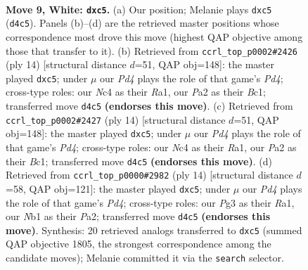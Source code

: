 \documentclass[11pt]{article}
\begin{document}
\clearpage

\begin{figure}[p]\centering
\begin{subfigure}{0.46\textwidth}\centering
\resizebox{\linewidth}{!}{%
\newchessgame
\chessboard[
  setfen={rnbq1rk1/pp2bpp1/4pn2/2p4p/2NP4/6P1/PP2PPBP/RNBQ1RK1 w - - 0 9},
  showmover=false,
  pgfstyle=straightmove, color=movearrow, markmove={d4-c5}
]}
\caption{}
\end{subfigure}\hfill
\begin{subfigure}{0.46\textwidth}\centering
\resizebox{\linewidth}{!}{%
\newchessgame
\chessboard[
  setfen={rnbq1rk1/pp2bppp/4pn2/2p1N3/2pP4/6P1/PP2PPBP/RNBQ1RK1 w - - 0 8},
  showmover=false,
  pgfstyle=straightmove, color=movearrow, markmove={d4-c5}
]}
\caption{}
\end{subfigure}
\\[4pt]
\begin{subfigure}{0.46\textwidth}\centering
\resizebox{\linewidth}{!}{%
\newchessgame
\chessboard[
  setfen={rnbq1rk1/pp2bppp/4pn2/2p1N3/2pP4/6P1/PP2PPBP/RNBQ1RK1 w - - 0 8},
  showmover=false,
  pgfstyle=straightmove, color=movearrow, markmove={d4-c5}
]}
\caption{}
\end{subfigure}\hfill
\begin{subfigure}{0.46\textwidth}\centering
\resizebox{\linewidth}{!}{%
\newchessgame
\chessboard[
  setfen={rnbq1rk1/pp2bppp/4pn2/2p5/2pP4/N4NP1/PP2PPBP/R1BQ1RK1 w - - 0 8},
  showmover=false,
  pgfstyle=straightmove, color=movearrow, markmove={d4-c5}
]}
\caption{}
\end{subfigure}
\caption{\textbf{Move 9, White: \texttt{dxc5}.} (a) Our position; Melanie plays \texttt{dxc5} (\texttt{d4c5}). Panels (b)--(d) are the retrieved master positions whose correspondence most drove this move (highest QAP objective among those that transfer to it). (b) Retrieved from \texttt{ccrl\_top\_p0002\#2426} (ply 14) [structural distance $d$=51, QAP obj=148]: the master played \texttt{dxc5}; under $\mu$ our \emph{Pd4} plays the role of that game's \emph{Pd4}; cross-type roles: our \emph{N}c4 as their \emph{R}a1, our \emph{P}a2 as their \emph{B}c1; transferred move \texttt{d4c5} \textbf{(endorses this move)}. (c) Retrieved from \texttt{ccrl\_top\_p0002\#2427} (ply 14) [structural distance $d$=51, QAP obj=148]: the master played \texttt{dxc5}; under $\mu$ our \emph{Pd4} plays the role of that game's \emph{Pd4}; cross-type roles: our \emph{N}c4 as their \emph{R}a1, our \emph{P}a2 as their \emph{B}c1; transferred move \texttt{d4c5} \textbf{(endorses this move)}. (d) Retrieved from \texttt{ccrl\_top\_p0000\#2982} (ply 14) [structural distance $d$=58, QAP obj=121]: the master played \texttt{dxc5}; under $\mu$ our \emph{Pd4} plays the role of that game's \emph{Pd4}; cross-type roles: our \emph{P}g3 as their \emph{R}a1, our \emph{N}b1 as their \emph{P}a2; transferred move \texttt{d4c5} \textbf{(endorses this move)}. Synthesis: 20 retrieved analogs transferred to \texttt{dxc5} (summed QAP objective 1805, the strongest correspondence among the candidate moves); Melanie committed it via the \texttt{search} selector.}
\label{fig:thought-m16}
\end{figure}
\end{document}
